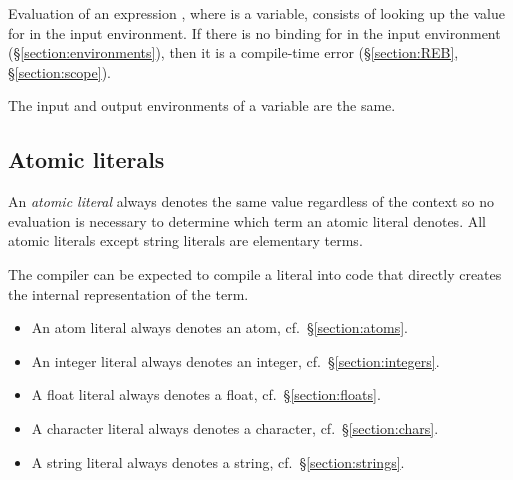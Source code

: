 \EVALUATION

Evaluation of an expression , where  is a variable,
consists of looking up the value for  in the input environment.
If there is no binding for  in the input environment
(\S\ref{section:environments}), then it is
a compile-time error (\S\ref{section:REB}, \S\ref{section:scope}).

\ENVIRONMENTS

The input and output environments of a variable are the same.

\subsection{Atomic literals}

\label{section:atomic-literals}

An \emph{atomic literal} always denotes the same value regardless of
the context so no evaluation is necessary to determine which term an
atomic literal denotes.  All atomic literals except string literals
are elementary terms.

\SYNTAX

\begin{rules}
       { \OR
         \OR
         \OR
         \OR
        }

       { \OR
	 }
\end{rules}

\EVALUATION

The compiler can be expected to compile a literal into code that directly
creates the internal representation of the term.

\begin{itemize}
\item An atom literal always denotes an atom, cf.~\S\ref{section:atoms}.
\item An integer literal always denotes an integer, cf.~\S\ref{section:integers}.
\item A float literal always denotes a float, cf.~\S\ref{section:floats}.
\item A character literal always denotes a character, cf.~\S\ref{section:chars}.
\item A string literal always denotes a string, cf.~\S\ref{section:strings}.
\end{itemize}

